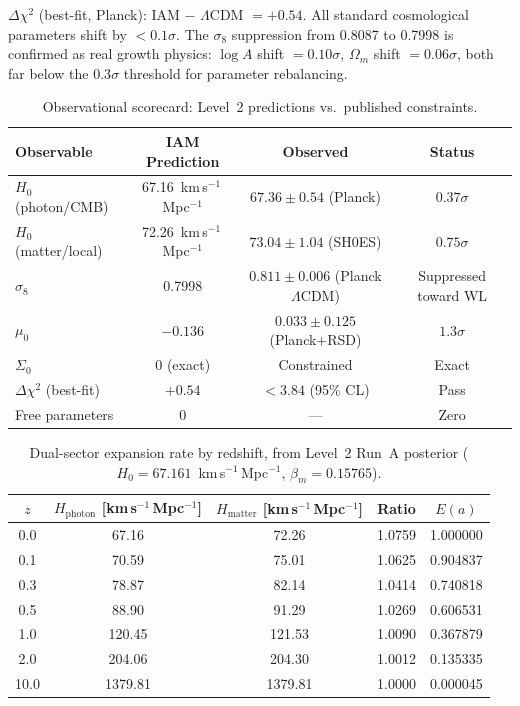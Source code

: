 \documentclass[11pt,letterpaper]{article}
\begin{document}
$\Delta\chi^2$ (best-fit, Planck): IAM $-$ $\Lambda$CDM $= +0.54$. All standard cosmological parameters shift by $< 0.1\sigma$. The $\sigma_8$ suppression from 0.8087 to 0.7998 is confirmed as real growth physics: $\log A$ shift $= 0.10\sigma$, $\Omega_m$ shift $= 0.06\sigma$, both far below the $0.3\sigma$ threshold for parameter rebalancing.

\begin{table}[h]
\centering
\caption{Observational scorecard: Level~2 predictions vs.\ published constraints.}
\label{tab:level2_scorecard}
\begin{tabular}{lccc}
\toprule
Observable & IAM Prediction & Observed & Status \\
\midrule
$H_0$ (photon/CMB) & 67.16~km\,s$^{-1}$\,Mpc$^{-1}$ & $67.36 \pm 0.54$ (Planck) & $0.37\sigma$ \\
$H_0$ (matter/local) & 72.26~km\,s$^{-1}$\,Mpc$^{-1}$ & $73.04 \pm 1.04$ (SH0ES) & $0.75\sigma$ \\
$\sigma_8$ & 0.7998 & $0.811 \pm 0.006$ (Planck $\Lambda$CDM) & Suppressed toward WL \\
$\mu_0$ & $-0.136$ & $0.033 \pm 0.125$ (Planck+RSD) & $1.3\sigma$ \\
$\Sigma_0$ & 0 (exact) & Constrained & Exact \\
$\Delta\chi^2$ (best-fit) & $+0.54$ & $< 3.84$ (95\% CL) & Pass \\
Free parameters & 0 & --- & Zero \\
\bottomrule
\end{tabular}
\end{table}

\begin{table}[h]
\centering
\caption{Dual-sector expansion rate by redshift, from Level~2 Run~A posterior ($H_0 = 67.161$~km\,s$^{-1}$\,Mpc$^{-1}$, $\beta_m = 0.15765$).}
\label{tab:level2_expansion}
\begin{tabular}{ccccc}
\toprule
$z$ & $H_\mathrm{photon}$ [km\,s$^{-1}$\,Mpc$^{-1}$] & $H_\mathrm{matter}$ [km\,s$^{-1}$\,Mpc$^{-1}$] & Ratio & $E(a)$ \\
\midrule
0.0 & 67.16 & 72.26 & 1.0759 & 1.000000 \\
0.1 & 70.59 & 75.01 & 1.0625 & 0.904837 \\
0.3 & 78.87 & 82.14 & 1.0414 & 0.740818 \\
0.5 & 88.90 & 91.29 & 1.0269 & 0.606531 \\
1.0 & 120.45 & 121.53 & 1.0090 & 0.367879 \\
2.0 & 204.06 & 204.30 & 1.0012 & 0.135335 \\
10.0 & 1379.81 & 1379.81 & 1.0000 & 0.000045 \\
\bottomrule
\end{tabular}
\end{table}
\end{document}
